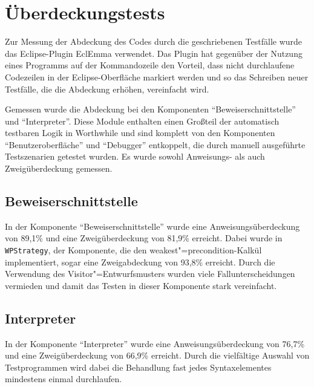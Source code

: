 \section{Überdeckungstests}
Zur Messung der Abdeckung des Codes durch die geschriebenen Testfälle wurde das Eclipse-Plugin EclEmma verwendet. Das Plugin hat gegenüber der Nutzung eines Programms auf der Kommandozeile den Vorteil, dass nicht durchlaufene Codezeilen in der Eclipse-Oberfläche markiert werden und so das Schreiben neuer Testfälle, die die Abdeckung erhöhen, vereinfacht wird.

Gemessen wurde die Abdeckung bei den Komponenten ``Beweiserschnittstelle'' und ``Interpreter''. Diese Module enthalten einen Großteil der automatisch testbaren Logik in Worthwhile und sind komplett von den Komponenten ``Benutzeroberfläche'' und ``Debugger'' entkoppelt, die durch manuell ausgeführte Testszenarien getestet wurden. Es wurde sowohl Anweisungs- als auch Zweigüberdeckung gemessen.

\subsection{Beweiserschnittstelle}
In der Komponente ``Beweiserschnittstelle'' wurde eine Anweisungsüberdeckung von 89,1\% und eine Zweigüberdeckung von 81,9\% erreicht. Dabei wurde in \texttt{WPStrategy}, der Komponente, die den weakest"=precondition-Kalkül implementiert, sogar eine Zweigabdeckung von 93,8\% erreicht. Durch die Verwendung des Visitor"=Entwurfsmusters wurden viele Fallunterscheidungen vermieden und damit das Testen in dieser Komponente stark vereinfacht.

\subsection{Interpreter}
In der Komponente ``Interpreter'' wurde eine Anweisungsüberdeckung von 76,7\% und eine Zweigüberdeckung von 66,9\% erreicht. Durch die vielfältige Auswahl von Testprogrammen wird dabei die Behandlung fast jedes Syntaxelementes mindestens einmal durchlaufen.
